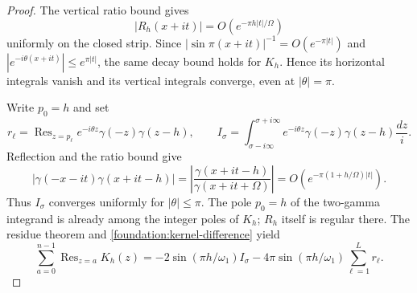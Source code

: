 \documentclass[11pt]{article}
\numberwithin{equation}{section}
\theoremstyle{definition}
\theoremstyle{remark}
\DeclareMathOperator{\Res}{Res}
\begin{document}
\begin{proof}
The vertical ratio bound gives
\[
 |R_h(x+it)|=O(e^{-\pi h|t|/\Omega})
\]
uniformly on the closed strip. Since
$|\sin\pi(x+it)|^{-1}=O(e^{-\pi|t|})$ and
$|e^{-i\theta(x+it)}|\leq e^{\pi|t|}$, the same decay bound holds
for $K_h$. Hence its horizontal integrals vanish and its vertical
integrals converge, even at $|\theta|=\pi$.

Write $p_0=h$ and set
\[
 r_\ell=\Res_{z=p_\ell}
       e^{-i\theta z}\gamma(-z)\gamma(z-h),\qquad
 I_\sigma=\int_{\sigma-i\infty}^{\sigma+i\infty}
       e^{-i\theta z}\gamma(-z)\gamma(z-h)\frac{dz}{i}.
\]
Reflection and the ratio bound give
\[
 |\gamma(-x-it)\gamma(x+it-h)|
 =\left|\frac{\gamma(x+it-h)}{\gamma(x+it+\Omega)}\right|
 =O(e^{-\pi(1+h/\Omega)|t|}).
\]
Thus $I_\sigma$ converges uniformly for $|\theta|\leq\pi$.
The pole $p_0=h$ of the two-gamma integrand is already among the
integer poles of $K_h$; $R_h$ itself is regular there.
The residue theorem and \eqref{foundation:kernel-difference} yield
\begin{equation}\label{foundation:rectangle}
 \sum_{a=0}^{n-1}\Res_{z=a}K_h(z)
 =-2\sin(\pi h/\omega_1)I_\sigma
  -4\pi\sin(\pi h/\omega_1)\sum_{\ell=1}^{L}r_\ell.
\end{equation}


\end{proof}
\end{document}
